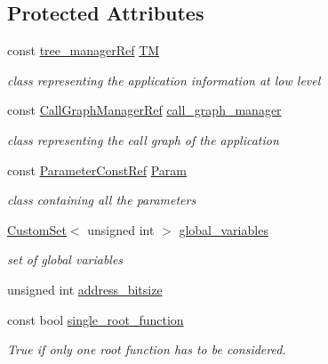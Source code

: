 \subsection*{Protected Attributes}
\begin{DoxyCompactItemize}
\item 
const \hyperlink{tree__manager_8hpp_a96ff150c071ce11a9a7a1e40590f205e}{tree\+\_\+manager\+Ref} \hyperlink{classapplication__manager_aebaa10d554ec03bd1c3921116a07dbfe}{TM}
\begin{DoxyCompactList}\small\item\em class representing the application information at low level \end{DoxyCompactList}\item 
const \hyperlink{call__graph__manager_8hpp_aefd741adcd456a04c45fd3df98acdb2c}{Call\+Graph\+Manager\+Ref} \hyperlink{classapplication__manager_a2d7ccc7f2e3151e6838f1dc6400ce6d8}{call\+\_\+graph\+\_\+manager}
\begin{DoxyCompactList}\small\item\em class representing the call graph of the application \end{DoxyCompactList}\item 
const \hyperlink{Parameter_8hpp_a37841774a6fcb479b597fdf8955eb4ea}{Parameter\+Const\+Ref} \hyperlink{classapplication__manager_ae975e0d3da59a3180f343fa936d72353}{Param}
\begin{DoxyCompactList}\small\item\em class containing all the parameters \end{DoxyCompactList}\item 
\hyperlink{custom__set_8hpp_a615bc2f42fc38a4bb1790d12c759e86f}{Custom\+Set}$<$ unsigned int $>$ \hyperlink{classapplication__manager_ac1a43ee7ae1155ff55f0073ef289b85a}{global\+\_\+variables}
\begin{DoxyCompactList}\small\item\em set of global variables \end{DoxyCompactList}\item 
unsigned int \hyperlink{classapplication__manager_abff6b028fd71e5805c69f6d24ea1d0d2}{address\+\_\+bitsize}
\item 
const bool \hyperlink{classapplication__manager_a02b25f02aeb5258b95c702142953e937}{single\+\_\+root\+\_\+function}
\begin{DoxyCompactList}\small\item\em True if only one root function has to be considered. \end{DoxyCompactList}\item 

\end{DoxyCompactItemize}

